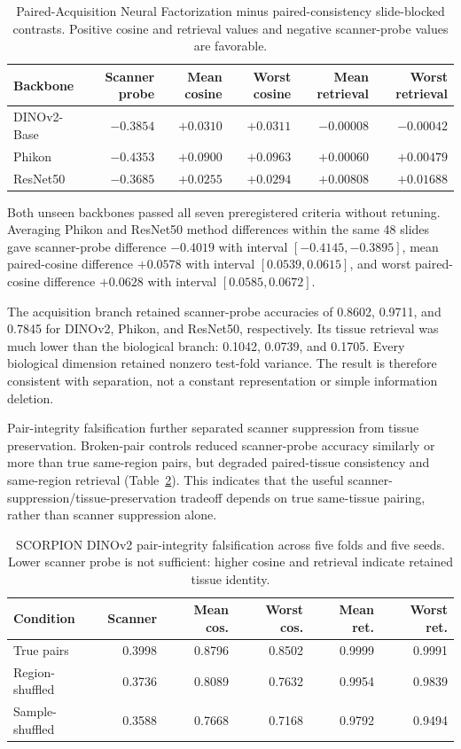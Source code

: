 \documentclass[10pt]{article}
\begin{document}
\begin{table}[t]
\centering
\caption{Paired-Acquisition Neural Factorization minus paired-consistency slide-blocked contrasts. Positive cosine and retrieval values and negative scanner-probe values are favorable.}
\small
\begin{tabular}{lrrrrr}
\toprule
Backbone & Scanner probe & Mean cosine & Worst cosine & Mean retrieval & Worst retrieval \\
\midrule
DINOv2-Base & $-0.3854$ & $+0.0310$ & $+0.0311$ & $-0.00008$ & $-0.00042$ \\
Phikon & $-0.4353$ & $+0.0900$ & $+0.0963$ & $+0.00060$ & $+0.00479$ \\
ResNet50 & $-0.3685$ & $+0.0255$ & $+0.0294$ & $+0.00808$ & $+0.01688$ \\
\bottomrule
\end{tabular}
\label{tab:crossbackbone}
\end{table}

Both unseen backbones passed all seven preregistered criteria without retuning. Averaging Phikon and ResNet50 method differences within the same 48 slides gave scanner-probe difference $-0.4019$ with interval $[-0.4145,-0.3895]$, mean paired-cosine difference $+0.0578$ with interval $[0.0539,0.0615]$, and worst paired-cosine difference $+0.0628$ with interval $[0.0585,0.0672]$.

The acquisition branch retained scanner-probe accuracies of 0.8602, 0.9711, and 0.7845 for DINOv2, Phikon, and ResNet50, respectively. Its tissue retrieval was much lower than the biological branch: 0.1042, 0.0739, and 0.1705. Every biological dimension retained nonzero test-fold variance. The result is therefore consistent with separation, not a constant representation or simple information deletion.

Pair-integrity falsification further separated scanner suppression from tissue preservation. Broken-pair controls reduced scanner-probe accuracy similarly or more than true same-region pairs, but degraded paired-tissue consistency and same-region retrieval (Table~\ref{tab:pair_integrity}). This indicates that the useful scanner-suppression/tissue-preservation tradeoff depends on true same-tissue pairing, rather than scanner suppression alone.

\begin{table}[t]
\centering
\caption{SCORPION DINOv2 pair-integrity falsification across five folds and five seeds. Lower scanner probe is not sufficient: higher cosine and retrieval indicate retained tissue identity.}
\scriptsize
\setlength{\tabcolsep}{2.2pt}
\begin{tabular}{@{}lrrrrr@{}}
\toprule
Condition & Scanner & Mean cos. & Worst cos. & Mean ret. & Worst ret. \\
\midrule
True pairs & 0.3998 & 0.8796 & 0.8502 & 0.9999 & 0.9991 \\
Region-shuffled & 0.3736 & 0.8089 & 0.7632 & 0.9954 & 0.9839 \\
Sample-shuffled & 0.3588 & 0.7668 & 0.7168 & 0.9792 & 0.9494 \\
\bottomrule
\end{tabular}
\label{tab:pair_integrity}
\end{table}
\end{document}
